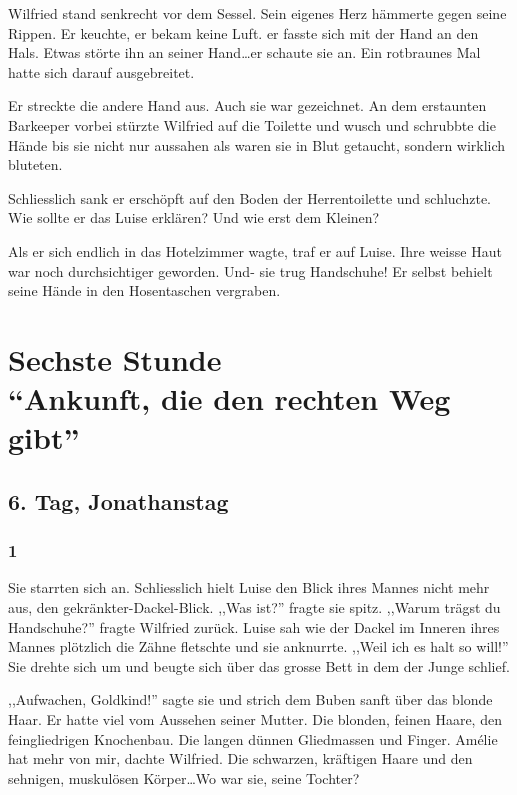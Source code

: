 \documentclass[11pt,titlepage,a5paper]{book}
\begin{document}
Wilfried stand senkrecht vor dem Sessel. Sein eigenes Herz hämmerte gegen seine Rippen. Er keuchte, er bekam keine Luft. er fasste sich mit der Hand an den Hals. Etwas störte ihn an seiner Hand\dots er schaute sie an. Ein rotbraunes Mal hatte sich darauf ausgebreitet. 

Er streckte die andere Hand aus. Auch sie war gezeichnet. An dem erstaunten Barkeeper vorbei stürzte Wilfried auf die Toilette und wusch und schrubbte die Hände bis sie nicht nur aussahen als waren sie in Blut getaucht, sondern wirklich bluteten. 


Schliesslich sank er erschöpft auf den Boden der Herrentoilette und schluchzte. Wie sollte er das Luise erklären? Und wie erst dem Kleinen?

Als er sich endlich in das Hotelzimmer wagte, traf er auf Luise. Ihre weisse Haut war noch durchsichtiger geworden. Und- sie trug Handschuhe! Er selbst behielt seine Hände in den Hosentaschen vergraben.


\part*{Sechste Stunde\\"`Ankunft, die den rechten Weg gibt"'}

\chapter*{6. Tag, Jonathanstag}

\section*{1}

Sie starrten sich an. Schliesslich hielt Luise den Blick ihres Mannes nicht mehr aus, den gekränkter-Dackel-Blick. ,,Was ist?'' fragte sie spitz. ,,Warum trägst du Handschuhe?'' fragte Wilfried zurück. Luise sah wie der Dackel im Inneren ihres Mannes  plötzlich die Zähne fletschte und sie anknurrte. ,,Weil ich es halt so will!'' Sie drehte sich um und beugte sich über das grosse Bett in dem der Junge schlief. 

,,Aufwachen, Goldkind!'' sagte sie und strich dem Buben sanft über das blonde Haar. Er hatte viel vom Aussehen seiner Mutter. Die blonden, feinen Haare, den feingliedrigen Knochenbau. Die langen dünnen Gliedmassen und Finger. Amélie hat mehr von mir, dachte Wilfried. Die schwarzen, kräftigen Haare und den sehnigen, muskulösen Körper\dots Wo war sie, seine Tochter? 
\end{document}
